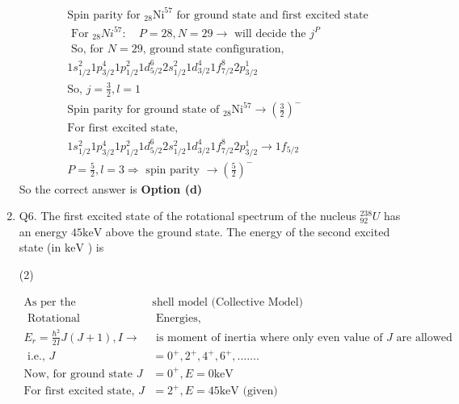 \begin{enumerate}
	\begin{answer}
		\begin{align*}
		&\text{Spin parity for ${ }_{28} \mathrm{Ni}^{57}$ for ground state and first excited   state}\\
		&\text{ For ${ }_{28} N i^{57}: \quad P=28, N=29 \rightarrow$ will decide the $j^P$ }\\
		&\text{ So, for $N=29$, ground state configuration,}\\
		&\text{$1 s_{1 / 2}^2 1 p_{3 / 2}^4 1 p_{1 / 2}^2 1 d_{5 / 2}^6 2 s_{1 / 2}^2 1 d_{3 / 2}^4 1 f_{7 / 2}^8 2 p_{3 / 2}^1$}\\
		&\text{So, $j=\frac{3}{2}, l=1$}\\
		&\text{Spin parity for ground state of ${ }_{28} \mathrm{Ni}^{57} \rightarrow\left(\frac{3}{2}\right)^{-}$}\\
		&\text{For first excited state,}\\
		&1 s_{1 / 2}^2 1 p_{3 / 2}^4 1 p_{1 / 2}^2 1 d_{5 / 2}^6 2 s_{1 / 2}^2 1 d_{3 / 2}^4 1 f_{7 / 2}^8 2 p_{3 / 2}^1 \rightarrow 1 f_{5 / 2}\\
		&\text{$P=\frac{5}{2}, l=3 \Rightarrow$ spin parity $\rightarrow\left(\frac{5}{2}\right)^{-}$}
		\end{align*}
		So the correct answer is \textbf{Option (d)}
	\end{answer}
	\item Q6. The first excited state of the rotational spectrum of the nucleus ${ }_{92}^{238} U$ has an energy $45 \mathrm{keV}$ above the ground state. The energy of the second excited state (in $\mathrm{keV}$ ) is
	{}
	\begin{tasks}(2)
	\end{tasks}
	\begin{answer}
		\begin{align*}
		\text{As per the }&\text{shell model (Collective Model)}\\
		\text{	Rotational}&\text{ Energies,}\\
		E_r=\frac{\hbar^2}{2 I} J(J+1), I \rightarrow&\text{ is moment of inertia where only even value of $J$ are allowed }\\
		\text{	i.e., }J&=0^{+}, 2^{+}, 4^{+}, 6^{+}, \ldots \ldots.\\
		\text{Now, for ground state }J&=0^{+}, E=0 \mathrm{keV}\\
		\text{For first excited state, }J&=2^{+}, E=45 \mathrm{keV}\text{ (given)}\\

\end{align*}
\end{answer}
\end{enumerate}
